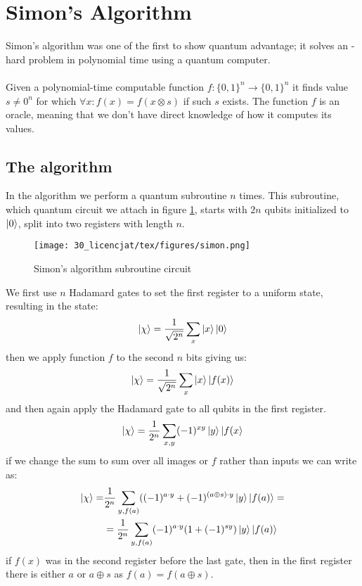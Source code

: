 \section{Simon's Algorithm}
Simon's algorithm was one of the first to show quantum advantage; it solves an -hard problem in polynomial time using a quantum computer. \\\\
Given a polynomial-time computable function $f:\{0,1\}^n \to \{0,1\}^n$ it finds value $s\neq0^n$ for which $\forall x:f(x)=f(x\otimes s)$ if such $s$ exists. The function $f$ is an oracle, meaning that we don't have direct knowledge of how it computes its values.
\subsection{The algorithm}
In the algorithm we perform a quantum subroutine $n$ times. This subroutine, which quantum circuit we attach in figure \ref{fig:simon}, starts with $2n$ qubits initialized to $\ket{0}$, split into two registers with length $n$.\\
\begin{figure}[ht!]
    \centering
    \texttt{[image: 30\_licencjat/tex/figures/simon.png]}
    \caption{Simon's algorithm subroutine circuit}
    \label{fig:simon}
\end{figure}\newpage
We first use $n$ Hadamard gates to set the first register to a uniform state, resulting in the state:
\begin{align*}
    \ket{\chi}=\frac{1}{\sqrt{2^n}}\sum_x \ket{x}\ket{0}
\end{align*}
then we apply function $f$ to the second $n$ bits giving us:
\begin{align*}
    \ket{\chi}=\frac{1}{\sqrt{2^n}}\sum_x \ket{x}\ket{f(x)}
\end{align*}
and then again apply the Hadamard gate to all qubits in the first register.
\begin{align*}
    \ket{\chi}=\frac{1}{2^n}\sum_{x,y} (-1)^{xy}\ket{y}\ket{f(x}
\end{align*}
if we change the sum to sum over all images or $f$ rather than inputs we can write as:
\begin{align*}
    \ket{\chi}=&\frac{1}{2^n}\sum_{y,f(a)}((-1)^{a\cdot y}+(-1)^{(a\oplus s)\cdot y}\ket{y}\ket{f(a)}=\\
    &=\frac{1}{2^n}\sum_{y,f(a)}(-1)^{a\cdot y}(1+(-1)^{sy})\ket{y}\ket{f(a)}
\end{align*}
if $f(x)$ was in the second register before the last gate, then in the first register there is either $a$ or $a\oplus s$ as $f(a)=f(a\oplus s)$.\\\\
